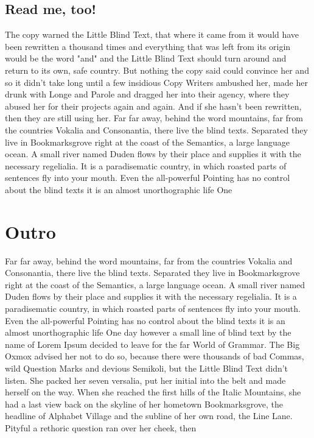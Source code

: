 \subsection{Read me, too!}
\label{sec:read-me-too}

The copy warned the Little Blind Text, that where it came from it would
have been rewritten a thousand times and everything that was left from its
origin would be the word "and" and the Little Blind Text should turn around
and return to its own, safe country. But nothing the copy said could
convince her and so it didn't take long until a few insidious Copy Writers
ambushed her, made her drunk with Longe and Parole and dragged her into
their agency, where they abused her for their projects again and again. And
if she hasn't been rewritten, then they are still using her. Far far away,
behind the word mountains, far from the countries Vokalia and Consonantia,
there live the blind texts. Separated they live in Bookmarksgrove right at
the coast of the Semantics, a large language ocean. A small river named
Duden flows by their place and supplies it with the necessary
regelialia. It is a paradisematic country, in which roasted parts of
sentences fly into your mouth. Even the all-powerful Pointing has no
control about the blind texts it is an almost unorthographic life One 

\section{Outro}
\label{sec:outro}

Far far away, behind the word mountains, far from the countries Vokalia and
Consonantia, there live the blind texts. Separated they live in
Bookmarksgrove right at the coast of the Semantics, a large language
ocean. A small river named Duden flows by their place and supplies it with
the necessary regelialia. It is a paradisematic country, in which roasted
parts of sentences fly into your mouth. Even the all-powerful Pointing has
no control about the blind texts it is an almost unorthographic life One
day however a small line of blind text by the name of Lorem Ipsum decided
to leave for the far World of Grammar. The Big Oxmox advised her not to do
so, because there were thousands of bad Commas, wild Question Marks and
devious Semikoli, but the Little Blind Text didn't listen. She packed her
seven versalia, put her initial into the belt and made herself on the
way. When she reached the first hills of the Italic Mountains, she had a
last view back on the skyline of her hometown Bookmarksgrove, the headline
of Alphabet Village and the subline of her own road, the Line Lane. Pityful
a rethoric question ran over her cheek, then 